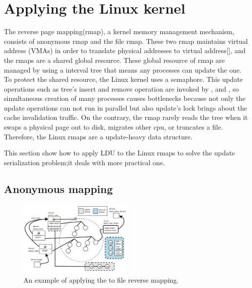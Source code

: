 \section{Applying the Linux kernel}



The reverse page mapping(rmap), a kernel memory management mechanism, consists
of anonymous rmap and the file rmap.
These two rmap maintains virtual address (VMAs) in order to translate physical
addresses to virtual address[], and the rmaps are a shared global resource.
These global resource of rmap are managed by using a interval tree that means
any processes can update the one.
To protect the shared resource, the Linux kernel uses a semaphore.
This update operations such as tree's insert and remove operation are invoked by
,  and , so simultaneous creation of many
processes causes bottlenecks because not only the update operations can not run
in parallel but also update's lock brings about the cache invalidation traffic.
On the contrary, the rmap rarely reads the tree when it swaps a physical page
out to disk, migrates other cpu, or truncates a file.
Therefore, the Linux rmaps are a update-heavy data structure. 

This section show how to apply LDU to the Linux rmaps to solve the update
serialization problem;it deals with more practical one.

\subsection{Anonymous mapping}

\begin{figure}[tb]
  \begin{center}
     \includegraphics[width=0.5\textwidth,height=0.5\textheight,keepaspectratio]{fig/anon_vma}
  \end{center}
  \caption{An example of applying the  to file reverse mapping. }
  \label{fig:anonvmaramp}
\end{figure}

